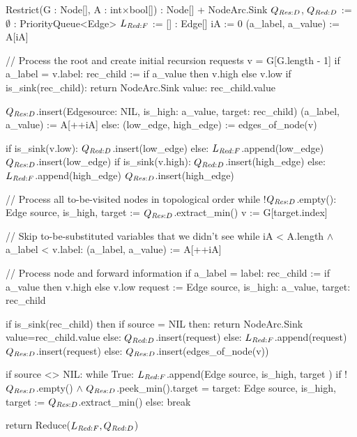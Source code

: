\begin{blstlisting}
  Restrict(G : Node[], A : int$\times$bool[]) : Node[] + NodeArc.Sink
    $\RestrictQrec$, $\ReduceQdep$ := $\emptyset$ : PriorityQueue<Edge>
    $\ReduceLforward$ := [] : Edge[]
    iA := 0
    (a_label, a_value) := A[iA]

    // Process the root and create initial recursion requests
    v = G[G.length - 1]
    if a_label = v.label:
      rec_child := if a_value then v.high else v.low
      if is_sink(rec_child): return NodeArc.Sink{ value: rec_child.value }

      $\RestrictQrec$.insert(Edge{source: NIL, is_high: a_value, target: rec_child})
      (a_label, a_value) := A[++iA]
    else:
      (low_edge, high_edge) := edges_of_node(v)

      if is_sink(v.low): $\ReduceQdep$.insert(low_edge)
      else: $\ReduceLforward$.append(low_edge)
            $\RestrictQrec$.insert(low_edge)
      if is_sink(v.high): $\ReduceQdep$.insert(high_edge)
      else: $\ReduceLforward$.append(high_edge)
            $\RestrictQrec$.insert(high_edge)

    // Process all to-be-visited nodes in topological order
    while !$\RestrictQrec$.empty():
      Edge{ source, is_high, target } := $\RestrictQrec$.extract_min()
      v := G[target.index]

      // Skip to-be-substituted variables that we didn't see
      while iA < A.length $\land$ a_label < v.label:
        (a_label, a_value) := A[++iA]

      // Process node and forward information
      if a_label = label:
        rec_child := if a_value then v.high else v.low
        request := Edge{ source, is_high: a_value, target: rec_child }

        if is_sink(rec_child)
        then if source = NIL
          then: return NodeArc.Sink{ value=rec_child.value }
          else: $\ReduceQdep$.insert(request)
        else: $\ReduceLforward$.append(request)
              $\RestrictQrec$.insert(request)
      else:
        $\RestrictQrec$.insert(edges_of_node(v))

        if source <> NIL:
          while True:
            $\ReduceLforward$.append(Edge{ source, is_high, target })
            if !$\RestrictQrec$.empty() $\land$ $\RestrictQrec$.peek_min().target = target:
              Edge{ source, is_high, target } := $\RestrictQrec$.extract_min()
            else: break

    return Reduce($\ReduceLforward, \ReduceQdep$)
\end{blstlisting}
